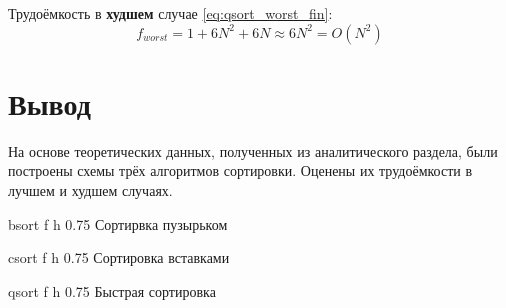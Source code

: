 Трудоёмкость в \textbf{худшем} случае \eqref{eq:qsort_worst_fin}:
\begin{equation}
    \label{eq:qsort_worst_fin}
    f_{worst} = 1 + 6N^2 + 6N \approx 6N^2 = O(N^{2})
\end{equation}
\section*{Вывод}

На основе теоретических данных, полученных из аналитического раздела, были построены схемы трёх алгоритмов сортировки. Оценены их трудоёмкости в лучшем и худшем случаях.

\clearpage

{bsort} %
{f} %
{h} %
{0.75\textwidth} %
{Сортирвка пузырьком} %
\clearpage

{csort} %
{f} %
{h} %
{0.75\textwidth} %
{Сортировка вставками} %
\clearpage

{qsort} %
{f} %
{h} %
{0.75\textwidth} %
{Быстрая сортировка} %
\clearpage